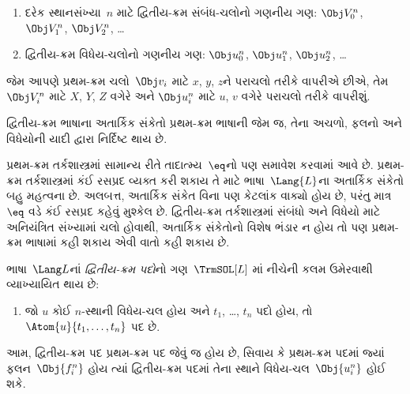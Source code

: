 \begin{enumerate}
\item દરેક સ્થાનસંખ્યા~$n$ માટે દ્વિતીય-ક્રમ સંબંધ-ચલોનો
  ગણનીય ગણ: $\Obj V_0^n$, $\Obj V_1^n$, $\Obj V_2^n$, \dots
\item દ્વિતીય-ક્રમ વિધેય-ચલોનો ગણનીય ગણ:
  $\Obj u_0^n$, $\Obj u_1^n$, $\Obj u_2^n$, \dots
\end{enumerate}

જેમ આપણે પ્રથમ-ક્રમ ચલો~$\Obj v_i$ માટે $x$, $y$, $z$ને પરાચલો
તરીકે વાપરીએ છીએ, તેમ~$\Obj V_i^n$ માટે $X$, $Y$, $Z$ વગેરે અને
$\Obj u_i^n$ માટે $u$, $v$ વગેરે પરાચલો તરીકે વાપરીશું.

\begin{explain}
દ્વિતીય-ક્રમ ભાષાના અતાર્કિક સંકેતો પ્રથમ-ક્રમ ભાષાની જેમ જ, તેના
અચળો, ફલનો અને વિધેયોની યાદી દ્વારા
નિર્દિષ્ટ થાય છે.

પ્રથમ-ક્રમ તર્કશાસ્ત્રમાં સામાન્ય રીતે તાદાત્મ્ય~$\eq$નો પણ સમાવેશ
કરવામાં આવે છે. પ્રથમ-ક્રમ તર્કશાસ્ત્રમાં કંઈ રસપ્રદ વ્યક્ત કરી શકાય
તે માટે ભાષા~$\Lang{L}$ના અતાર્કિક સંકેતો બહુ મહત્વના છે. અલબત્ત,
અતાર્કિક સંકેત વિના પણ કેટલાંક વાક્યો હોય છે, પરંતુ માત્ર~$\eq$
વડે કંઈ રસપ્રદ કહેવું મુશ્કેલ છે. દ્વિતીય-ક્રમ તર્કશાસ્ત્રમાં સંબંધો
અને વિધેયો માટે અનિયંત્રિત સંખ્યામાં ચલો હોવાથી, અતાર્કિક સંકેતોનો
વિશેષ ભંડાર ન હોય તો પણ પ્રથમ-ક્રમ ભાષામાં કહી શકાય એવી વાતો કહી
શકાય છે.
\end{explain}

\begin{defn}[દ્વિતીય-ક્રમ પદો]
ભાષા~$\Lang L$નાં \emph{દ્વિતીય-ક્રમ પદો}નો ગણ~$\TrmSOL[L]$
માં નીચેની કલમ ઉમેરવાથી વ્યાખ્યાયિત
થાય છે:
\begin{enumerate}
\item જો $u$ કોઈ $n$-સ્થાની વિધેય-ચલ હોય અને $t_1$, \dots, $t_n$
  પદો હોય, તો $\Atom{u}{t_1, \ldots, t_n}$ પદ છે.
\end{enumerate}
\end{defn}

\begin{explain}
આમ, દ્વિતીય-ક્રમ પદ પ્રથમ-ક્રમ પદ જેવું જ હોય છે, સિવાય કે પ્રથમ-ક્રમ
પદમાં જ્યાં ફલન~$\Obj{f^n_i}$ હોય ત્યાં દ્વિતીય-ક્રમ પદમાં
તેના સ્થાને વિધેય-ચલ~$\Obj{u^n_i}$ હોઈ શકે.
\end{explain}

